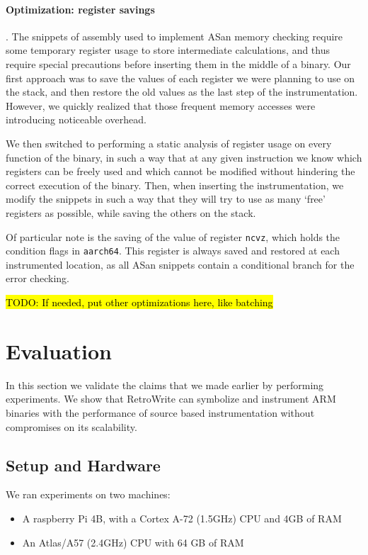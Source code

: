 \documentclass[a4paper,11pt,oneside]{report}
\newcommand{\sysname}{RetroWrite\xspace}
\DeclareRobustCommand{\todo}[1]{{\sethlcolor{cyan}\hl{TODO: #1}}}
\begin{document}
\subsubsection{Optimization: register savings}.
The snippets of assembly used to implement ASan memory checking require some 
temporary register usage to store intermediate calculations, and thus require 
special precautions before inserting them in the middle of a binary. Our first 
approach was to save the values of each register we were planning to use on the 
stack, and then restore the old values as the last step of the instrumentation.  
However, we quickly realized that those frequent memory accesses were 
introducing noticeable overhead. 

We then switched to performing a static analysis of register usage on every 
function of the binary, in such a way that at any given instruction we know 
which registers can be freely used and which cannot be modified without 
hindering the correct execution of the binary. Then, when inserting the 
instrumentation, we modify the snippets in such a way that they will try to use 
as many `free' registers as possible, while saving the others on the stack.

Of particular note is the saving of the value of register \texttt{ncvz}, which 
holds the condition flags in \texttt{aarch64}. This register is always saved 
and restored at each instrumented location, as all ASan snippets contain a 
conditional branch for the error checking. 

\todo{If needed, put other optimizations here, like batching}


\chapter{Evaluation}



In this section we validate the claims that we made earlier by performing experiments.
We show that \sysname can symbolize and instrument ARM binaries with the performance of
source based instrumentation without compromises on its scalability.

\section{Setup and Hardware} 
We ran experiments on two machines:
\begin{itemize}
	\item A raspberry Pi 4B, with a Cortex A-72 (1.5GHz) CPU and 4GB of RAM
	\item An Atlas/A57 (2.4GHz) CPU with 64 GB of RAM
\end{itemize}
\end{document}
